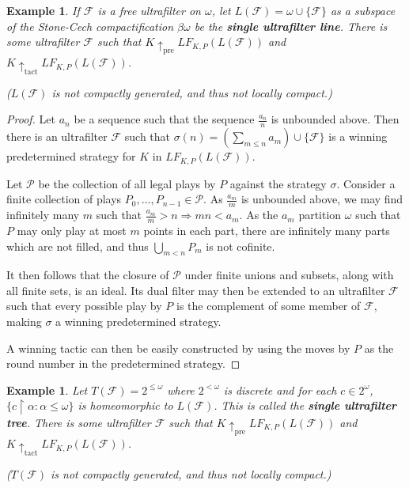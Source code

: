 \documentclass[11pt]{article}
\theoremstyle{plain}
\newtheorem{example}[theorem]{Example}
\theoremstyle{definition}
\theoremstyle{remark}
\newcommand{\prewin}{\uparrow_{\text{pre}}}
\newcommand{\tactwin}{\uparrow_{\text{tact}}}
\newcommand{\lfkpgame}[1]{LF_{K,P}(#1)}
\newcommand{\<}{\langle}
\renewcommand{\>}{\rangle}
\begin{document}
\begin{example}
If $\mathcal{F}$ is a free ultrafilter on $\omega$, let $L(\mathcal{F})=\omega \cup \{\mathcal{F}\}$ as a subspace of the Stone-Cech compactification $\beta\omega$ be the \textbf{single ultrafilter line}. There is some ultrafilter $\mathcal{F}$ such that $K \prewin \lfkpgame{L(\mathcal{F})}$ and $K \tactwin \lfkpgame{L(\mathcal{F})}$.

($L(\mathcal{F})$ is not compactly generated, and thus not locally compact.)
\end{example}

\begin{proof}
Let $a_n$ be a sequence such that the sequence $\frac{a_n}{n}$ is unbounded above. Then there is an ultrafilter $\mathcal{F}$ such that $\sigma(n)=(\sum_{m\leq n} a_m )\cup \{\mathcal{F}\}$ is a winning predetermined strategy for $K$ in $\lfkpgame{L(\mathcal{F})}$.

Let $\mathcal{P}$ be the collection of all legal plays by $P$ against the strategy $\sigma$. Consider a finite collection of plays $P_0,\dots,P_{n-1}\in \mathcal{P}$. As $\frac{a_m}{m}$ is unbounded above, we may find infinitely many $m$ such that $\frac{a_m}{m}>n \Rightarrow mn<a_m$. As the $a_m$ partition $\omega$ such that $P$ may only play at most $m$ points in each part, there are infinitely many parts which are not filled, and thus $\bigcup_{m<n} P_m$ is not cofinite.

It then follows that the closure of $\mathcal{P}$ under finite unions and subsets, along with all finite sets, is an ideal. Its dual filter may then be extended to an ultrafilter $\mathcal{F}$ such that every possible play by $P$ is the complement of some member of $\mathcal{F}$, making $\sigma$ a winning predetermined strategy.

A winning tactic can then be easily constructed by using the moves by $P$ as the round number in the predetermined strategy.
\end{proof}

\begin{example}
Let $T(\mathcal{F}) = 2^{\leq\omega}$ where $2^{<\omega}$ is discrete and for each $c\in 2^\omega$, $\{c \restriction \alpha : \alpha \leq \omega\}$ is homeomorphic to $L(\mathcal{F})$. This is called the \textbf{single ultrafilter tree}. There is some ultrafilter $\mathcal{F}$ such that $K \prewin \lfkpgame{L(\mathcal{F})}$ and $K \tactwin \lfkpgame{L(\mathcal{F})}$.

($T(\mathcal{F})$ is not compactly generated, and thus not locally compact.)
\end{example}
\end{document}
